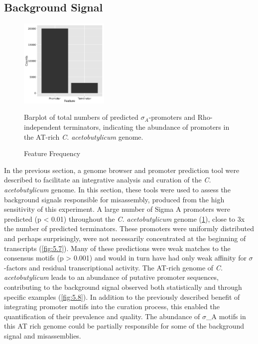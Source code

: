 


\subsection{Background Signal}
\begin{figure}
\small
\vspace{-20pt}
\begin{center}
\includegraphics[width=0.38\textwidth]{images/Assembly/Background_signal/prediction_frequency.png}
\caption{Feature Frequency}\label{fig:5.6}
Barplot of total numbers of predicted $\sigma_{A}$-promoters and Rho-independent terminators, indicating the abundance of promoters in the AT-rich \textit{C. acetobutylicum} genome.
\end{center}
\vspace{-20pt}

\end{figure}

In the previous section, a genome browser and promoter prediction tool were described to facilitate an integrative analysis and curation of the \textit{C. acetobutylicum} genome. In this section, these tools were used to assess the background signals responsible for misassembly, produced from the high sensitivity of this experiment. A large number of Sigma A promoters were predicted (p < 0.01) throughout the \textit{C. acetobutylicum} genome (\ref{fig:5.6}), close to 3x the number of predicted terminators. These promoters were uniformly distributed and perhaps surprisingly, were not necessarily concentrated at the beginning of transcripts (\ref{fig:5.7}). Many of these predictions were weak matches to the consensus motifs (p > 0.001) and would in turn have had only weak affinity for $\sigma$-factors and residual transcriptional activity. The AT-rich genome of \textit{C. acetobutylicum} leads to an abundance of putative promoter sequences, contributing to the background signal observed both statistically and through specific examples (\ref{fig:5.8}). In addition to the previously described benefit of integrating promoter motifs into the curation process, this enabled the quantification of their prevalence and quality. The abundance of $\sigma$_{A} motifs in this AT rich genome could be partially responsible for some of the background signal and misassemblies.

